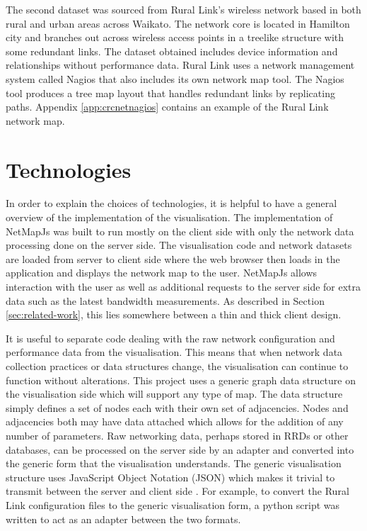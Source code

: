 \documentclass[11pt, a4paper]{report}
\begin{document}
The second dataset was sourced from Rural Link's wireless network based in both
rural and urban areas across Waikato. The network core is located in Hamilton
city and branches out across wireless access points in a treelike structure
with some redundant links. The dataset obtained includes device information and
relationships without performance data. Rural Link uses a network management
system called Nagios that also includes its own network map tool. The Nagios
tool produces a tree map layout that handles redundant links by replicating
paths. Appendix \ref{app:crcnetnagios} contains an example of the Rural Link
network map. 


\section{Technologies}
\label{sec:technologies}

In order to explain the choices of technologies, it is helpful to have a general
overview of the implementation of the visualisation. The implementation of
NetMapJs was built to run mostly on the client side with only the network data
processing done on the server side. The visualisation code and network datasets
are loaded from server to client side where the web browser then loads in the
application and displays the network map to the user. NetMapJs allows
interaction with the user as well as additional requests to the server side for
extra data such as the latest bandwidth measurements. As described in Section
\ref{sec:related-work}, this lies somewhere between a thin and thick client
design.

It is useful to separate code dealing with the raw network configuration and
performance data from the visualisation. This means that when network data
collection practices or data structures change, the visualisation can continue
to function without alterations. This project uses a generic graph data
structure on the visualisation side which will support any type of map. The data
structure simply defines a set of nodes each with their own set of adjacencies.
Nodes and adjacencies both may have data attached which allows for the addition
of any number of parameters. Raw networking data, perhaps stored in RRDs or
other databases, can be processed on the server side by an adapter and converted
into the generic form that the visualisation understands. The generic
visualisation structure uses JavaScript Object Notation (JSON) which makes it
trivial to transmit between the server and client side \cite{rfc4627}. For
example, to convert the Rural Link configuration files to the generic
visualisation form, a python script was written to act as an adapter between the
two formats. 
\end{document}
